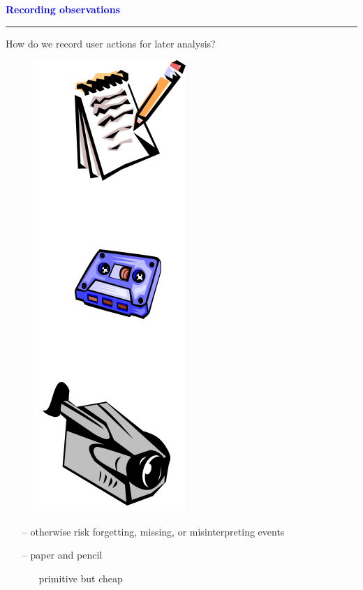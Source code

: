 \documentclass[pdf]{beamer}
\begin{document}
{%
{
\begin{frame}
	\vspace{8mm}
	\textcolor{Blue}{\textbf{\large{Recording observations}}}
    \textcolor{red}{\rule{10cm}{1mm}}
    How do we record user actions for later analysis?
    \begin{figure}
      \centering
      \includegraphics[scale = 0.6, right]{19_toate.png}
    \end{figure}
    \begin{itemize}
      \item[\textcolor{Blue}{--}] otherwise risk forgetting, missing, or misinterpreting events
      \item[\textcolor{Blue}{--}] paper and pencil
      \begin{itemize}
        \item[\textcolor{Blue}{\textbullet}] primitive but cheap

\end{itemize}
\end{itemize}
\end{frame}}}
\end{document}
